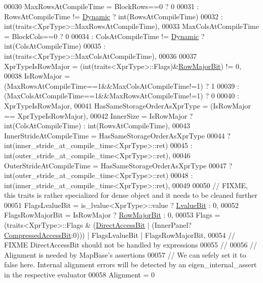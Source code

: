 \begin{DoxyCode}
00030     MaxRowsAtCompileTime = BlockRows==0 ? 0
00031                          : RowsAtCompileTime != \hyperlink{namespace_eigen_ad81fa7195215a0ce30017dfac309f0b2}{Dynamic} ? int(RowsAtCompileTime)
00032                          : int(traits<XprType>::MaxRowsAtCompileTime),
00033     MaxColsAtCompileTime = BlockCols==0 ? 0
00034                          : ColsAtCompileTime != \hyperlink{namespace_eigen_ad81fa7195215a0ce30017dfac309f0b2}{Dynamic} ? int(ColsAtCompileTime)
00035                          : int(traits<XprType>::MaxColsAtCompileTime),
00036 
00037     XprTypeIsRowMajor = (int(traits<XprType>::Flags)&\hyperlink{group__flags_gae4f56c2a60bbe4bd2e44c5b19cbe8762}{RowMajorBit}) != 0,
00038     IsRowMajor = (MaxRowsAtCompileTime==1&&MaxColsAtCompileTime!=1) ? 1
00039                : (MaxColsAtCompileTime==1&&MaxRowsAtCompileTime!=1) ? 0
00040                : XprTypeIsRowMajor,
00041     HasSameStorageOrderAsXprType = (IsRowMajor == XprTypeIsRowMajor),
00042     InnerSize = IsRowMajor ? int(ColsAtCompileTime) : int(RowsAtCompileTime),
00043     InnerStrideAtCompileTime = HasSameStorageOrderAsXprType
00044                              ? int(inner\_stride\_at\_compile\_time<XprType>::ret)
00045                              : int(outer\_stride\_at\_compile\_time<XprType>::ret),
00046     OuterStrideAtCompileTime = HasSameStorageOrderAsXprType
00047                              ? int(outer\_stride\_at\_compile\_time<XprType>::ret)
00048                              : int(inner\_stride\_at\_compile\_time<XprType>::ret),
00049 
00050     \textcolor{comment}{// FIXME, this traits is rather specialized for dense object and it needs to be cleaned further}
00051     FlagsLvalueBit = is\_lvalue<XprType>::value ? \hyperlink{group__flags_gae2c323957f20dfdc6cb8f44428eaec1a}{LvalueBit} : 0,
00052     FlagsRowMajorBit = IsRowMajor ? \hyperlink{group__flags_gae4f56c2a60bbe4bd2e44c5b19cbe8762}{RowMajorBit} : 0,
00053     Flags = (traits<XprType>::Flags & (\hyperlink{group__flags_gabf1e9d0516a933445a4c307ad8f14915}{DirectAccessBit} | (InnerPanel?
      \hyperlink{group__flags_gaed0244284da47a2b8661261431173caf}{CompressedAccessBit}:0))) | FlagsLvalueBit | FlagsRowMajorBit,
00054     \textcolor{comment}{// FIXME DirectAccessBit should not be handled by expressions}
00055     \textcolor{comment}{// }
00056     \textcolor{comment}{// Alignment is needed by MapBase's assertions}
00057     \textcolor{comment}{// We can sefely set it to false here. Internal alignment errors will be detected by an
       eigen\_internal\_assert in the respective evaluator}
00058     Alignment = 0

\end{DoxyCode}
